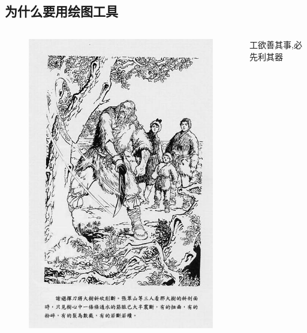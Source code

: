 \documentclass{beamerthemeMono}
\begin{document}
\subsection{为什么要用绘图工具}
\begin{frame}{\subsecname}{}

  \begin{columns}
    \begin{column}{.5\textwidth}
      \begin{figure}
        \centering \includegraphics[width=0.9\columnwidth]{屠龙宝刀.jpg}
      \end{figure}
    \end{column}

    \begin{column}{.48\textwidth}
      \begin{ornamentblock}
        \centering
        {工欲善其事,必先利其器\\
          }
      \end{ornamentblock}
    \end{column}
  \end{columns}

\end{frame}
\end{document}
